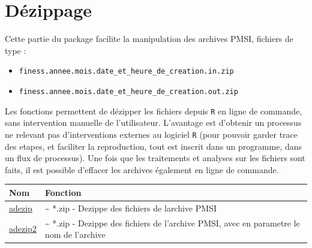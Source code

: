 \documentclass[]{book}
\providecommand{\tightlist}{%
  \setlength{\itemsep}{0pt}\setlength{\parskip}{0pt}}
\theoremstyle{definition}
\theoremstyle{definition}
\theoremstyle{definition}
\theoremstyle{remark}
\begin{document}
\section{Dézippage}\label{dezippage}

Cette partie du package facilite la manipulation des archives PMSI,
fichiers de type :

\begin{itemize}
\tightlist
\item
  \texttt{finess.annee.mois.date\_et\_heure\_de\_creation.in.zip}
\item
  \texttt{finess.annee.mois.date\_et\_heure\_de\_creation.out.zip}
\end{itemize}

Les fonctions permettent de dézipper les fichiers depuis \texttt{R} en
ligne de commande, sans intervention manuelle de l'utilisateur.
L'avantage est d'obtenir un processus ne relevant pas d'interventions
externes au logiciel \texttt{R} (pour pouvoir garder trace des etapes,
et faciliter la reproduction, tout est inscrit dans un programme, dans
un flux de processus). Une fois que les traitements et analyses sur les
fichiers sont faits, il est possible d'effacer les archives également en
ligne de commande.

\begin{longtable}[]{@{}ll@{}}
\toprule
\begin{minipage}[b]{0.10\columnwidth}\raggedright\strut
Nom\strut
\end{minipage} & \begin{minipage}[b]{0.84\columnwidth}\raggedright\strut
Fonction\strut
\end{minipage}\tabularnewline
\midrule
\endhead
\begin{minipage}[t]{0.10\columnwidth}\raggedright\strut
\href{https://im-aphp.github.io/pmeasyr/reference/adezip.html}{adezip}\strut
\end{minipage} & \begin{minipage}[t]{0.84\columnwidth}\raggedright\strut
\textasciitilde{} *.zip - Dezippe des fichiers de larchive PMSI\strut
\end{minipage}\tabularnewline
\begin{minipage}[t]{0.10\columnwidth}\raggedright\strut
\href{https://im-aphp.github.io/pmeasyr/reference/adezip2.html}{adezip2}\strut
\end{minipage} & \begin{minipage}[t]{0.84\columnwidth}\raggedright\strut
\textasciitilde{} *.zip - Dezippe des fichiers de l'archive PMSI, avec
en parametre le nom de l'archive\strut
\end{minipage}\tabularnewline
\bottomrule
\end{longtable}
\end{document}
